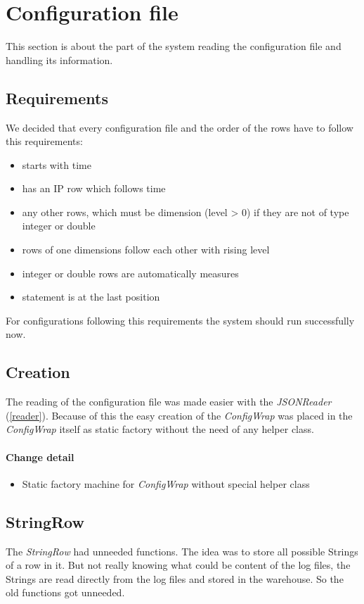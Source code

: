 \section{Configuration file}
This section is about the part of the system reading the configuration file
and handling its information.

\subsection{Requirements}
We decided that every configuration file and the order of the 
rows have to follow this requirements:
\begin{itemize}
  \item starts with time
  \item has an IP row which follows time
  \item any other rows, which must be dimension (level > 0) if they are not of
  type integer or double
  \item rows of one dimensions follow each other with rising level
  \item integer or double rows are automatically measures
  \item statement is at the last position
\end{itemize} 

For configurations following this requirements the system should run
successfully now.

\subsection{Creation}
The reading of the configuration file was made easier with the
\textit{JSONReader} (\ref{reader}). Because of this the easy creation
of the \textit{ConfigWrap} was placed in the \textit{ConfigWrap} itself as
static factory without the need of any helper class.

\paragraph{Change detail}
\begin{itemize}
  \item Static factory machine for \textit{ConfigWrap} without special helper class
\end{itemize}

\subsection{StringRow}
The \textit{StringRow} had unneeded functions. The idea was
to store all possible Strings of a row in it. But not really knowing what
could be content of the log files, the Strings are read directly from 
the log files and stored in the warehouse. So the old functions got unneeded.


